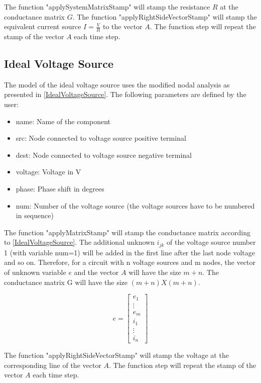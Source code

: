 The function "applySystemMatrixStamp" will stamp the resistance $R$ at the conductance matrix $G$.
The function "applyRightSideVectorStamp" will stamp the equivalent current source $I=\frac{V}{R}$ to the vector $A$.
The function step will repeat the stamp of the vector $A$ each time step.

\subsection{Ideal Voltage Source}

The model of the ideal voltage source uses the modified nodal analysis as presented in \ref{IdealVoltageSource}.
The following parameters are defined by the user:

\begin{itemize}
\item name: Name of the component
\item src: Node connected to voltage source positive terminal
\item dest: Node connected to voltage source negative terminal
\item voltage: Voltage in V
\item phase: Phase shift in degrees
\item num: Number of the voltage source (the voltage sources have to be numbered in sequence) 
\end{itemize}

The function "applyMatrixStamp" will stamp the conductance matrix according to \ref{IdealVoltageSource}. The additional unknown $i_{jk}$ of the voltage source number 1 (with variable num=1) will be added in the first line after the last node voltage and so on. Therefore, for a circuit with n voltage sources and m nodes, the vector of unknown variable $e$ and the vector $A$ will have the size $m+n$. The conductance matrix G will have the size $(m+n)X(m+n)$.

\begin{equation}
	e=
	\begin{bmatrix}
		e_1 \\
		\vdots \\
		e_m \\
		i_1 \\
		\vdots \\
		i_n
	\end{bmatrix}
\end{equation}

The function "applyRightSideVectorStamp" will stamp the voltage at the corresponding line of the vector $A$.
The function step will repeat the stamp of the vector $A$ each time step.

